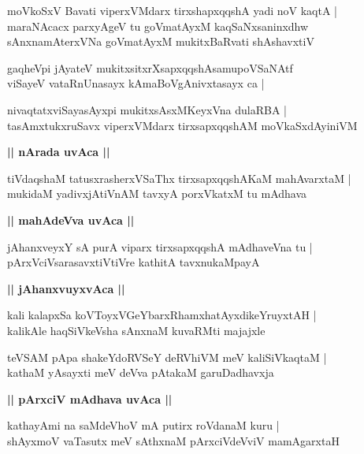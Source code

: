 \documentclass[twoside,12pt,openright]{book}
\newcounter{shloka}[chapter]
\def\uvaca#1{\centerline{{\large\textbf{#1}}}}
\begin{document}
\begin{shloka}%
moVkoSxV Bavati viperxVMdarx tirxshapxqqshA yadi noV kaqtA |\\
maraNAcacx parxyAgeV tu goVmatAyxM kaqSaNxsaninxdhw \\
sAnxnamAterxVNa goVmatAyxM mukitxBaRvati shAshavxtiV
\end{shloka}

\begin{shloka}%
gaqheVpi jAyateV mukitxsitxrXsapxqqshAsamupoVSaNAtf \\
viSayeV vataRnUnasayx kAmaBoVgAnivxtasayx ca |\\
\end{shloka}

\begin{shloka}%
nivaqtatxviSayasAyxpi mukitxsAsxMKeyxVna dulaRBA |\\
tasAmxtukxruSavx viperxVMdarx tirxsapxqqshAM moVkaSxdAyiniVM 
\end{shloka}

\uvaca{|| nArada uvAca ||}

\begin{shloka}%
tiVdaqshaM tatusxrasherxVSaThx tirxsapxqqshAKaM mahAvarxtaM |\\
mukidaM yadivxjAtiVnAM tavxyA porxVkatxM tu mAdhava
\end{shloka}

\uvaca{|| mahAdeVva uvAca ||}

\begin{shloka}%
jAhanxveyxY sA purA viparx tirxsapxqqshA mAdhaveVna tu |\\
pArxVciVsarasavxtiVtiVre kathitA tavxnukaMpayA 
\end{shloka}

\uvaca{|| jAhanxvuyxvAca ||}

\begin{shloka}%
kali kalapxSa koVToyxVGeYbarxRhamxhatAyxdikeYruyxtAH |\\
kalikAle haqSiVkeVsha sAnxnaM kuvaRMti majajxle
\end{shloka}

\begin{shloka}%
teVSAM pApa shakeYdoRVSeY deRVhiVM meV kaliSiVkaqtaM |\\
kathaM yAsayxti meV deVva pAtakaM garuDadhavxja
\end{shloka}

\uvaca{|| pArxciV mAdhava uvAca ||}

\begin{shloka}%
kathayAmi na saMdeVhoV mA putirx roVdanaM kuru |\\
shAyxmoV vaTasutx meV sAthxnaM pArxciVdeVviV mamAgarxtaH 
\end{shloka}
\end{document}
